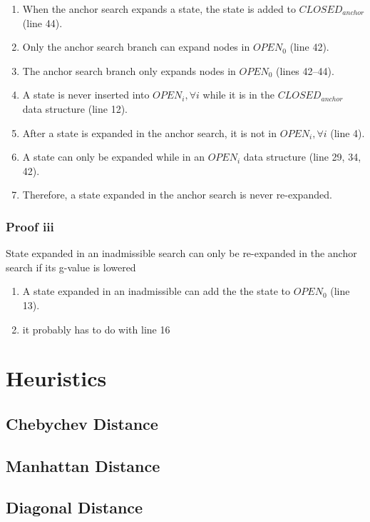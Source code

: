 \documentclass[11pt,draft]{article}
\begin{document}
\begin{enumerate}
    \item When the anchor search expands a state, the state is added to $CLOSED_{anchor}$ (line 44).
    \item Only the anchor search branch can expand nodes in $OPEN_0$ (line 42).
    \item The anchor search branch only expands nodes in $OPEN_0$ (lines 42--44).
    \item A state is never inserted into $OPEN_i, \forall i$ while it is in the $CLOSED_{anchor}$ data structure (line 12).
    \item After a state is expanded in the anchor search, it is not in $OPEN_i, \forall i$ (line 4).
    \item A state can only be expanded while in an $OPEN_i$ data structure (line 29, 34, 42).
    \item Therefore, a state expanded in the anchor search is never re-expanded.
\end{enumerate}

\subsubsection{Proof iii}
State expanded in an inadmissible search can only be re-expanded in the anchor search if its g-value is lowered

\begin{enumerate}
    \item A state expanded in an inadmissible can add the the state to $OPEN_0$ (line 13).
    \item it probably has to do with line 16
\end{enumerate}

\section{Heuristics}

\subsection{Chebychev Distance}

\subsection{Manhattan Distance}

\subsection{Diagonal Distance}
\end{document}
